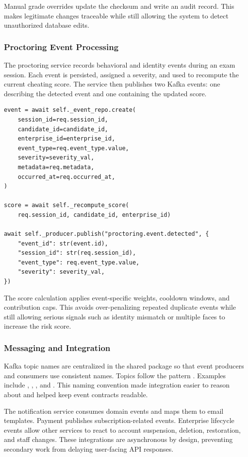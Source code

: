 Manual grade overrides update the checksum and write an audit record. This makes legitimate changes traceable while still allowing the system to detect unauthorized database edits.

\subsubsection{Proctoring Event Processing}
The proctoring service records behavioral and identity events during an exam session. Each event is persisted, assigned a severity, and used to recompute the current cheating score. The service then publishes two Kafka events: one describing the detected event and one containing the updated score.

\begingroup
\footnotesize
\begin{verbatim}
event = await self._event_repo.create(
    session_id=req.session_id,
    candidate_id=candidate_id,
    enterprise_id=enterprise_id,
    event_type=req.event_type.value,
    severity=severity_val,
    metadata=req.metadata,
    occurred_at=req.occurred_at,
)

score = await self._recompute_score(
    req.session_id, candidate_id, enterprise_id)

await self._producer.publish("proctoring.event.detected", {
    "event_id": str(event.id),
    "session_id": str(req.session_id),
    "event_type": req.event_type.value,
    "severity": severity_val,
})
\end{verbatim}
\endgroup

The score calculation applies event-specific weights, cooldown windows, and contribution caps. This avoids over-penalizing repeated duplicate events while still allowing serious signals such as identity mismatch or multiple faces to increase the risk score.

\subsubsection{Messaging and Integration}
Kafka topic names are centralized in the shared package so that event producers and consumers use consistent names. Topics follow the pattern . Examples include , , , and . This naming convention made integration easier to reason about and helped keep event contracts readable.

The notification service consumes domain events and maps them to email templates. Payment publishes subscription-related events. Enterprise lifecycle events allow other services to react to account suspension, deletion, restoration, and staff changes. These integrations are asynchronous by design, preventing secondary work from delaying user-facing API responses.

